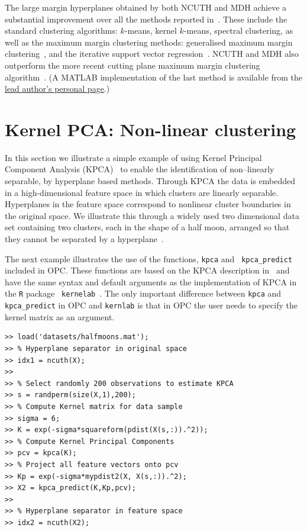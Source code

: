 \documentclass{book}
\begin{document}
\noindent
%
The large margin hyperplanes obtained by both NCUTH and MDH achieve a
substantial improvement over all the methods reported
in~\cite[Table~IV]{ZhangTK2009}. These include the standard clustering
algorithms: $k$-means, kernel $k$-means, spectral clustering, as well as the
maximum margin clustering methods: generalised maximum margin
clustering~\cite{Valizadegan2006}, and the iterative support vector
regression~\cite{ZhangTK2009}. NCUTH and MDH also outperform the more recent
cutting plane maximum margin clustering algorithm~\cite{WangZZ2010}. (A MATLAB
implementation of the last method is available from the
\href{https://sites.google.com/site/binzhao02/CPMMC.rar?attredirects=0} {lead
author's personal page}.)



\section{Kernel PCA: Non-linear clustering}\label{sec:kpca}

In this section we illustrate a simple example of using Kernel Principal
Component Analysis (KPCA)~\cite{ScholkopfSM1998} to enable the identification of
non--linearly separable, by hyperplane based methods.
%
Through KPCA the data is embedded in a high-dimensional feature space in which
clusters are linearly separable. Hyperplanes in the feature space correspond to
nonlinear cluster boundaries in the original space.  We illustrate this through
a widely used two dimensional data set containing two clusters, each in the
shape of a half moon, arranged so that they cannot be separated by a
hyperplane~\cite{Jain2005}. 

The next example illustrates the use of the functions, {\tt kpca} and {\tt
kpca\_predict} included in OPC. These functions are based on the KPCA
description in~\cite{ScholkopfSM1998} and have the same syntax and default
arguments as the implementation of KPCA in the {\tt R} package {\tt
kernelab}~\cite{kernlab}. The only important difference between {\tt kpca} and
{\tt kpca\_predict} in OPC and {\tt kernlab} is that in OPC the user needs to
specify the kernel matrix as an argument.



\begin{lstlisting}
>> load('datasets/halfmoons.mat');
>> % Hyperplane separator in original space
>> idx1 = ncuth(X);
>>
>> % Select randomly 200 observations to estimate KPCA
>> s = randperm(size(X,1),200);
>> % Compute Kernel matrix for data sample
>> sigma = 6;
>> K = exp(-sigma*squareform(pdist(X(s,:)).^2));
>> % Compute Kernel Principal Components
>> pcv = kpca(K);
>> % Project all feature vectors onto pcv
>> Kp = exp(-sigma*mypdist2(X, X(s,:)).^2);
>> X2 = kpca_predict(K,Kp,pcv);
>>
>> % Hyperplane separator in feature space
>> idx2 = ncuth(X2);
\end{lstlisting}
\end{document}
